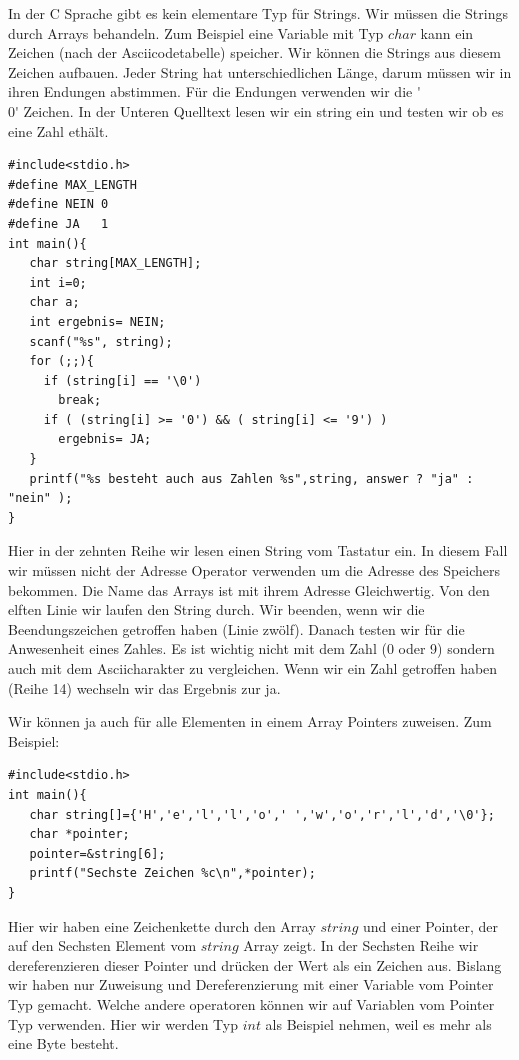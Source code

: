 \documentclass{article}[12pt]
\begin{document}
In der C Sprache gibt es kein elementare Typ für Strings. Wir müssen die Strings durch Arrays behandeln.
Zum Beispiel eine Variable mit Typ $char$ kann ein Zeichen (nach der Asciicodetabelle) speicher. Wir können
die Strings aus diesem Zeichen aufbauen. Jeder String hat unterschiedlichen Länge, darum müssen wir
in ihren Endungen abstimmen. Für die Endungen verwenden wir die \'{}\\0\'{} Zeichen. In der Unteren 
Quelltext lesen wir ein string ein und testen wir ob es eine Zahl ethält.
\begin{lstlisting}
#include<stdio.h>
#define MAX_LENGTH
#define NEIN 0
#define JA   1
int main(){
   char string[MAX_LENGTH];
   int i=0;
   char a;
   int ergebnis= NEIN;
   scanf("%s", string);
   for (;;){
     if (string[i] == '\0')
       break;
     if ( (string[i] >= '0') && ( string[i] <= '9') )
       ergebnis= JA;
   }
   printf("%s besteht auch aus Zahlen %s",string, answer ? "ja" : "nein" );
}
\end{lstlisting}
Hier in der zehnten Reihe wir lesen einen String vom Tastatur ein. In diesem Fall
wir müssen nicht der Adresse Operator verwenden um die Adresse des Speichers bekommen.
Die Name das Arrays ist mit ihrem Adresse Gleichwertig. Von den elften Linie wir laufen
den String durch. Wir beenden, wenn wir die Beendungszeichen getroffen haben (Linie zwölf).
Danach testen wir für die Anwesenheit eines Zahles. Es ist wichtig nicht mit dem Zahl (0 
oder 9) sondern auch mit dem Asciicharakter zu vergleichen. Wenn wir ein Zahl 
getroffen haben (Reihe 14) wechseln wir das Ergebnis zur ja.

Wir können ja auch für alle Elementen in einem Array Pointers zuweisen. Zum Beispiel:
\begin{lstlisting}
#include<stdio.h>
int main(){
   char string[]={'H','e','l','l','o',' ','w','o','r','l','d','\0'};
   char *pointer;
   pointer=&string[6];
   printf("Sechste Zeichen %c\n",*pointer);
}
\end{lstlisting} 
Hier wir haben eine Zeichenkette durch den Array $string$ und einer Pointer, der auf den Sechsten Element vom 
$string$ Array zeigt. In der Sechsten Reihe wir dereferenzieren dieser Pointer und drücken der Wert als ein 
Zeichen aus. Bislang wir haben nur Zuweisung und Dereferenzierung mit einer Variable vom Pointer Typ gemacht.
Welche andere operatoren können wir auf Variablen vom Pointer Typ verwenden. Hier wir werden Typ $int$ als Beispiel
nehmen, weil es mehr als eine Byte besteht.
\end{document}

